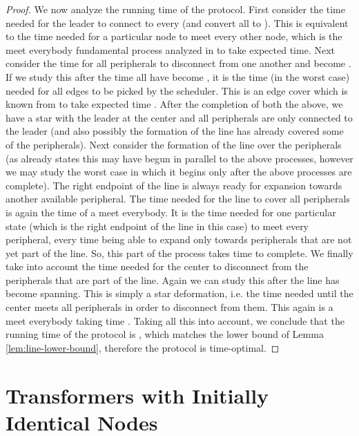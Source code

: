 \documentclass[preprint]{elsarticle}
\begin{document}
\begin{proof}
We now analyze the running time of the protocol. First consider the time needed for the leader to connect to every  (and convert all  to ). This is equivalent to the time needed for a particular node to meet every other node, which is the meet everybody fundamental process analyzed in \cite{MS14} to take  expected time. Next consider the time for all peripherals to disconnect from one another and become . If we study this after the time all  have become , it is the time (in the worst case) needed for all edges to be picked by the scheduler. This is an edge cover which is known from \cite{MS14} to take expected time . After the completion of both the above, we have a star with the leader at the center and all peripherals are only connected to the leader (and also possibly the formation of the line has already covered some of the peripherals). Next consider the formation of the line over the peripherals (as already states this may have begun in parallel to the above processes, however we may study the worst case in which it begins only after the above processes are complete). The right endpoint of the line is always ready for expansion towards another available peripheral. The time needed for the line to cover all peripherals is again the time of a meet everybody. It is the time needed for one particular state (which is the right endpoint of the line in this case) to meet every peripheral, every time being able to expand only towards peripherals that
are not yet part of the line. So, this part of the process takes time  to complete. We finally take into account the time needed for the center to disconnect from the peripherals that are part of the line. Again we can study this after the line has become spanning. This is simply a star deformation, i.e. the time needed until the center meets all peripherals in order to disconnect from them. This again is a meet everybody taking time . Taking all this into account, we conclude that the running time of the protocol is , which matches the  lower bound of Lemma \ref{lem:line-lower-bound}, therefore the protocol is time-optimal.
\end{proof}

\section{Transformers with Initially Identical Nodes}
\label{sec:identical-nodes}
\end{document}
